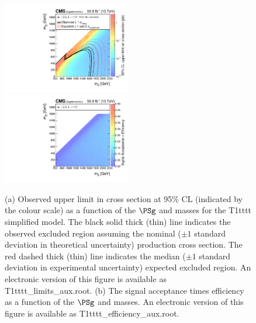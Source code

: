 \begin{figure}
    \begin{center}
            \includegraphics[width=0.50\textwidth]{Supplementary/T1ttttXSEC}
            \includegraphics[width=0.50\textwidth]{Supplementary/T1tttt_efficiency_aux}
        \caption{ (a) Observed upper limit in cross section at 95\% CL (indicated
        by the colour scale) as a function of 
        the $\PSg$ and \PSGczDo %
        masses for the 
        T1tttt %
        simplified  model.  The  black  solid thick  (thin)  line indicates  the
        observed  excluded  region  assuming   the  nominal  (${\pm}1$  standard
        deviation in theoretical uncertainty)  production cross section. The red
        dashed  thick  (thin)  line  indicates  the  median  (${\pm}1$  standard
        deviation in experimental uncertainty) expected excluded region.
    An electronic version of this figure is available as T1tttt\_limits\_aux.root.
        (b) The signal acceptance times efficiency as a function of 
        the $\PSg$ and \PSGczDo %
        masses.
    An electronic version of this figure is available as T1tttt\_efficiency\_aux.root.
        }
        \label{fig:T1tttt}
    \end{center}
\end{figure}

